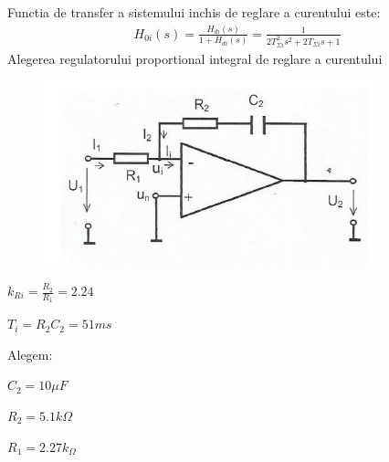 \documentclass[11pt]{article}
\begin{document}
Functia de transfer a sistemului inchis de reglare a curentului este:
\begin{align*}
H_{0i}(s)=\frac{H_{di}(s)}{1+H_{di}(s)}=\frac{1}{2T_{\Sigma i}^2s^2+2T_{\Sigma i}s+1}
\end{align*}
Alegerea regulatorului proportional integral de reglare a curentului
\begin{figure}[H]
	\centering
	\includegraphics[width=.6\linewidth]{fig16.png}
	\label{fig:test2}
\end{figure}
$k_{Ri}=\frac{R_2}{R_1}=2.24$ 

$T_i=R_2C_2=51ms$

Alegem:

$C_2=10\mu F$

$R_2 = 5.1 k\Omega$

$R_1 = 2.27 k_\Omega$
\end{document}
